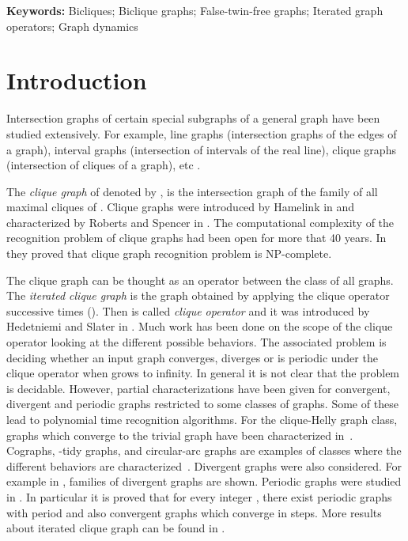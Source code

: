 \documentclass[12pt]{article}
\begin{document}
\normalsize

{\bf Keywords:} Bicliques; Biclique graphs; False-twin-free graphs; Iterated graph operators; Graph dynamics
\newpage


\section{Introduction}
Intersection graphs of certain special subgraphs of a general graph have been studied 
extensively. For example, line graphs (intersection graphs of the edges of a graph), 
interval graphs (intersection of intervals of the real line), clique graphs (intersection of cliques of a graph), etc 
\cite{BoothLuekerJCSS1976,BrandstadtLeSpinrad1999,EscalanteAMSUH1973,FulkersonGrossPJM1965, GavrilJCTSB1974, LehotJA1974,McKeeMcMorris1999}.

The \emph{clique graph} of  denoted by , is the intersection graph of the family of all maximal cliques of . Clique graphs were introduced by Hamelink in \cite{HamelinkJCT1968} and characterized by Roberts and Spencer in  \cite{RobertsSpencerJCTSB1971}. 
The computational complexity of the recognition problem of clique graphs had been open for more that 40 years. In  \cite{Alc'onFariaFigueiredoGutierrez2006} they proved that clique graph recognition problem is NP-complete.

The clique graph can be thought as an operator between the class of all graphs. The \emph{iterated clique graph}  is the graph obtained by applying the clique operator  successive times (). Then  is called \emph{clique operator} and it was introduced by Hedetniemi and Slater in \cite{HedetniemiSlater1972}. 
Much work has been done on the scope of the clique operator looking at the different possible behaviors. 
The associated problem is deciding whether an input graph converges, diverges or is periodic under the clique operator when  grows to infinity. 
In general it is not clear that the problem is decidable.  
However, partial characterizations have been given for convergent, divergent and periodic graphs restricted to some classes of graphs. Some of these lead to polynomial time recognition algorithms.
For the clique-Helly graph class, graphs which converge to the trivial graph have been characterized in~\cite{BandeltPrisnerJCTSB1991}.
Cographs, -tidy graphs, and circular-arc graphs  are examples of classes where the different behaviors are 
characterized~\cite{MelloMorganaLiveraniDAM2006,LarrionMelloMorganaNeumann-LaraPizanaDM2004}. Divergent graphs were also considered. For example in 
\cite{Neumann1981}, families of divergent graphs are shown. Periodic graphs were studied in
\cite{EscalanteAMSUH1973,LarrionNeumann-LaraPizanaDM2002}. In particular it is proved that for every integer , there exist periodic graphs with period  and also convergent graphs which converge in  steps. More results about iterated clique graph can be found in 
\cite{LarrionPizanaVillarroel-FloresDM2008,Frias-ArmentaNeumann-LaraPizanaDM2004,LarrionNeumann-LaraGC1997,LarrionNeumann-LaraDM1999,
LarrionNeumann-LaraDM2000,PizanaDM2003}.
\end{document}
